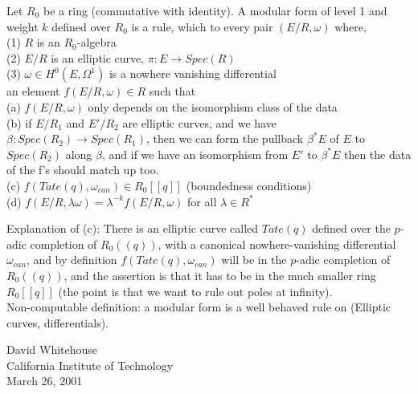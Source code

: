 \documentclass[11pt]{amsart}
\begin{document}
\begin{defn}
Let $R_0$ be a ring (commutative with identity). A modular form of
level 1 and weight $k$ defined over $R_0$ is a rule, which to every
pair $(E/R,\omega)$ where,\\
(1) $R$ is an $R_0$-algebra\\
(2) $E/R$ is an elliptic curve, $\pi : E\to Spec(R)$\\
(3) $\omega\in H^0(E,\Omega^1)$ is a nowhere vanishing differential\\
an element $f(E/R,\omega)\in R$ such that\\
(a) $f(E/R,\omega)$ only depends on the isomorphism class of the
data\\
(b) if $E/R_1$ and $E'/R_2$ are elliptic curves, and we have
$\beta:Spec(R_2)\to Spec(R_1)$, then we can form the pullback
$\beta^*E$ of $E$ to $Spec(R_2)$ along $\beta$, and
if we have an isomorphism from $E'$ to $\beta^*E$ then the data
of the f's should match up too.\\
(c) $f(Tate(q),\omega_{can})\in R_0[[q]]$ (boundedness conditions)\\
(d) $f(E/R,\lambda\omega) = \lambda^{-k}f(E/R,\omega)$ for all $\lambda\in R^*$
\end{defn}

Explanation of (c):
There is an elliptic curve called $Tate(q)$ defined over
the $p$-adic completion of $R_0((q))$, with a canonical nowhere-vanishing
differential $\omega_{can}$, and by definition $f(Tate(q),\omega_{can})$ will
be in the $p$-adic completion of $R_0((q))$, and the assertion is that
it has to be in the much smaller ring $R_0[[q]]$ (the point is that
we want to rule out poles at infinity).\\


Non-computable definition: a modular form is a well behaved rule on
(Elliptic curves, differentials).

\bigskip

\begin{flushright}
David Whitehouse\\
California Institute of Technology\\
March 26, 2001
\end{flushright}
\end{document}
